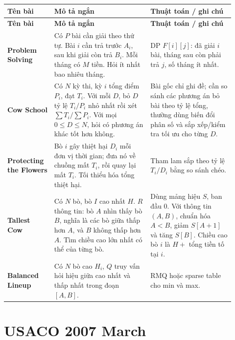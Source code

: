 \documentclass[11pt]{article}
\newenvironment{solutiontable}{%
  \small
  \setlength{\tabcolsep}{4pt}
  \renewcommand{\arraystretch}{1.14}
  \begin{longtable}{L{0.19\linewidth}L{0.39\linewidth}L{0.34\linewidth}}
  \toprule
  \textbf{Tên bài} & \textbf{Mô tả ngắn} & \textbf{Thuật toán / ghi chú}\\
  \midrule
  \endfirsthead
  \toprule
  \textbf{Tên bài} & \textbf{Mô tả ngắn} & \textbf{Thuật toán / ghi chú}\\
  \midrule
  \endhead
}{%
  \bottomrule
  \end{longtable}
  \normalsize
}
\newcommand{\problemrow}[3]{\textbf{#1} & #2 & #3\\\midrule}
\begin{document}
\begin{solutiontable}
\problemrow{Problem Solving}{Có \(P\) bài cần giải theo thứ tự. Bài \(i\) cần trả trước \(A_i\), sau khi giải còn trả \(B_i\). Mỗi tháng có \(M\) tiền. Hỏi ít nhất bao nhiêu tháng.}{DP \(F[i][j]\): đã giải \(i\) bài, tháng sau còn phải trả \(j\), số tháng ít nhất.}
\problemrow{Cow School}{Có \(N\) kỳ thi, kỳ \(i\) tổng điểm \(P_i\), đạt \(T_i\). Với mỗi \(D\), bỏ \(D\) tỷ lệ \(T_i/P_i\) nhỏ nhất rồi xét \(\sum T_i/\sum P_i\). Với mọi \(0\le D\le N\), hỏi có phương án khác tốt hơn không.}{Bài gốc chỉ ghi đề; cần so sánh các phương án bỏ bài theo tỷ lệ tổng, thường dùng biến đổi phân số và sắp xếp/kiểm tra tối ưu cho từng \(D\).}
\problemrow{Protecting the Flowers}{Bò \(i\) gây thiệt hại \(D_i\) mỗi đơn vị thời gian; đưa nó về chuồng mất \(T_i\), rồi quay lại mất \(T_i\). Tối thiểu hóa tổng thiệt hại.}{Tham lam sắp theo tỷ lệ \(T_i/D_i\) bằng so sánh chéo.}
\problemrow{Tallest Cow}{Có \(N\) bò, bò \(I\) cao nhất \(H\). \(R\) thông tin: bò \(A\) nhìn thấy bò \(B\), nghĩa là các bò giữa thấp hơn \(A\), và \(B\) không thấp hơn \(A\). Tìm chiều cao lớn nhất có thể của từng bò.}{Dùng mảng hiệu \(S\), ban đầu \(0\). Với thông tin \((A,B)\), chuẩn hóa \(A<B\), giảm \(S[A+1]\) và tăng \(S[B]\). Chiều cao bò \(i\) là \(H+\) tổng tiền tố tại \(i\).}
\problemrow{Balanced Lineup}{Có \(N\) bò cao \(H_i\), \(Q\) truy vấn hỏi hiệu giữa cao nhất và thấp nhất trong đoạn \([A,B]\).}{RMQ hoặc sparse table cho min và max.}
\end{solutiontable}

\section{USACO 2007 March}
\end{document}
